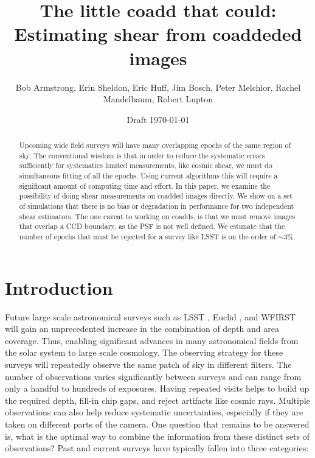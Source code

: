 \documentclass[fleqn,useAMS,usenatbib]{mnras}
\title{The little coadd that could:  Estimating shear from coaddeded images}
\author{Bob Armstrong, Erin Sheldon, Eric Huff, Jim Bosch, Peter Melchior, Rachel Mandelbaum, Robert Lupton}
\begin{document}
\date{Draft \today}
\maketitle
%
\begin{abstract}
Upcoming wide field surveys will have many overlapping epochs of the same region of sky.  The conventional wisdom is that in order to reduce the systematic errors sufficiently for systematics limited measurements, like cosmic shear, we must do simultaneous fitting of all the epochs.  Using current algorithms this will require a significant amount of computing time and effort.  In this paper, we examine the possibility of doing shear measurements on coadded images directly.  We show on a set of simulations that there is no bias or degradation in performance for two independent shear estimators.  The one caveat to working on coadds, is that we must remove images that overlap a CCD boundary, as the PSF is not well defined.  We estimate that the number of epochs that must be rejected for a survey like LSST is on the order of $\sim 3\%$.
\end{abstract}


\section{Introduction}

Future large scale astronomical surveys such as LSST \citep{LSST2009}, Euclid \citep{Laureijs2011}, and WFIRST \citep{Spergel2015} will gain an unprecedented increase in the combination of depth and area coverage.  Thus, enabling significant advances in many astronomical fields from the solar system to large scale cosmology.  The observing strategy for these surveys will repeatedly observe the same patch of sky in different filters.  The number of observations varies significantly between surveys and can range from only a handful to hundreds of exposures.  Having repeated visits helps to build up the required depth, fill-in chip gaps, and reject artifacts like cosmic rays.  Multiple observations can also help reduce systematic uncertainties, especially if they are taken on different parts of the camera.  One question that remains to be answered is, what is the optimal way to combine the information from these distinct sets of observations?  Past and current surveys have typically fallen into three categories:
\end{document}
